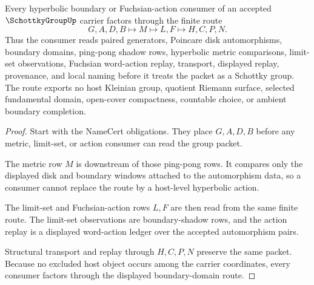 \begin{theorem}\label{thm:schottky-group-ping-pong-boundary-domain-route}
Every hyperbolic boundary or Fuchsian-action consumer of an accepted $\SchottkyGroupUp$ carrier factors through the finite route
$$
G,A,D,B \longmapsto M \longmapsto L,F \longmapsto H,C,P,N .
$$
Thus the consumer reads paired generators, Poincare disk automorphisms, boundary domains, ping-pong shadow rows, hyperbolic metric comparisons, limit-set observations, Fuchsian word-action replay, transport, displayed replay, provenance, and local naming before it treats the packet as a Schottky group. The route exports no host Kleinian group, quotient Riemann surface, selected fundamental domain, open-cover compactness, countable choice, or ambient boundary completion.
\end{theorem}
\begin{proof}
Start with the NameCert obligations. They place $G,A,D,B$ before any metric, limit-set, or action consumer can read the group packet.

The metric row $M$ is downstream of those ping-pong rows. It compares only the displayed disk and boundary windows attached to the automorphism data, so a consumer cannot replace the route by a host-level hyperbolic action.

The limit-set and Fuchsian-action rows $L,F$ are then read from the same finite route. The limit-set observations are boundary-shadow rows, and the action replay is a displayed word-action ledger over the accepted automorphism pairs.

Structural transport and replay through $H,C,P,N$ preserve the same packet. Because no excluded host object occurs among the carrier coordinates, every consumer factors through the displayed boundary-domain route.
\end{proof}



